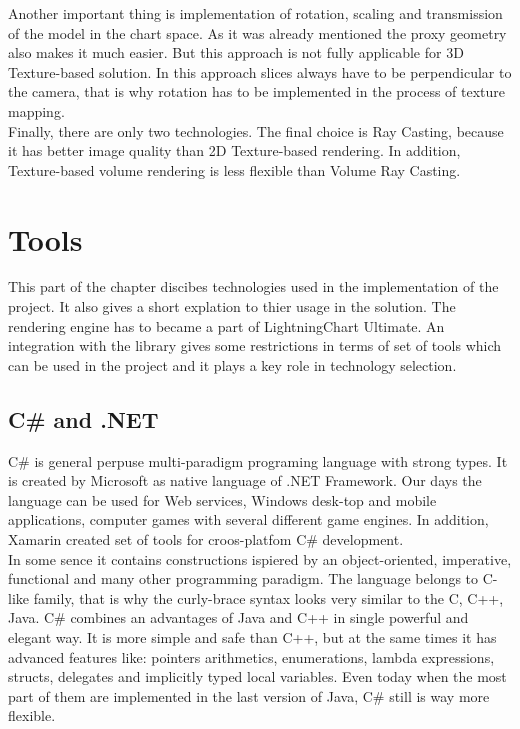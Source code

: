 \documentclass[twoside, english, 11pt]{report}
\begin{document}
Another important thing is implementation of rotation, scaling and transmission of the model in the chart space. As it was already mentioned the proxy geometry also makes it much easier. But this approach is not fully applicable for 3D Texture-based solution. In this approach slices always have to be perpendicular to the camera, that is why rotation has to be implemented in the process of texture mapping.\\

Finally, there are only two technologies. The final choice is Ray Casting, because it has better image quality than 2D Texture-based rendering. In addition, Texture-based volume rendering is less flexible than Volume Ray Casting.
\section{Tools}
This part of the chapter discibes technologies used in the implementation of the project. It also gives a short explation to thier usage in the solution. The rendering engine has to became a part of LightningChart Ultimate. An integration with the library gives some restrictions in terms of set of tools which can be used in the project and it plays a key role in technology selection.
\subsection{C\# and .NET}
C\# is general perpuse  multi-paradigm programing language with strong types. It is created by Microsoft as native language of .NET Framework. Our days the language can be used for Web services, Windows desk-top and mobile applications, computer games with several different game engines. In addition, Xamarin created set of tools for croos-platfom C\# development.\\

In some sence it contains constructions ispiered by an object-oriented, imperative, functional and many other programming paradigm. The language belongs to C-like family, that is why the curly-brace syntax looks very similar to the C, C++, Java.  C\# combines an advantages of Java and C++ in single powerful and elegant way. It is more simple and safe than C++, but at the same times it has advanced features like: pointers arithmetics, enumerations, lambda expressions, structs, delegates and implicitly typed local variables. Even today when the most part of them are implemented in the last version of Java, C\# still is way more flexible.\\
\end{document}
